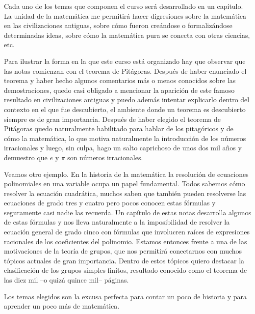 Cada uno de los temas que componen el curso será desarrollado en un capítulo. 
La unidad de la matemática me permitirá hacer digresiones
sobre la matemática en las civilizaciones antiguas, sobre cómo fueron creándose
o formalizándose determinadas ideas, sobre cómo la matemática pura se conecta
con otras ciencias, etc. 

Para ilustrar la forma en la que este curso está organizado hay que observar
que las notas comienzan con el teorema de Pitágoras. Después de haber enunciado
el teorema y haber hecho algunos comentarios más o menos conocidos sobre las
demostraciones, quedo casi obligado a mencionar la aparición de este famoso
resultado en civilizaciones antiguas y puedo además intentar explicarlo dentro
del contexto en el que fue descubierto, el ambiente donde un teorema
es descubierto siempre es de gran importancia. Después de haber elegido el
teorema de Pitágoras quedo naturalmente habilitado para hablar de los
pitagóricos y de cómo la matemática, lo que motiva
naturalmente la introducción de los números irracionales y luego, sin culpa, 
hago un salto caprichoso de unos dos mil años y demuestro que $e$ y $\pi$ son
números irracionales.

Veamos otro ejemplo. En la historia de la matemática la resolución de
ecuaciones polinomiales en una variable ocupa un papel fundamental. Todos
sabemos cómo resolver la ecuación cuadrática, muchos saben que también pueden
resolverse las ecuaciones de grado tres y cuatro pero pocos conocen estas
fórmulas y seguramente casi nadie las recuerda. Un capítulo de estas notas 
desarrolla algunos de estas fórmulas y nos
lleva naturalmente a la imposibilidad de resolver la ecuación general de grado
cinco con fórmulas que involucren raíces de expresiones racionales de los
coeficientes del polinomio. Estamos entonces frente a una de las motivaciones
de la teoría de grupos, que nos permitirá conectarnos con muchos tópicos
actuales de gran importancia. Dentro de estos tópicos quiero destacar la
clasificación de los grupos simples finitos, resultado conocido como el teorema
de las diez mil --o quizá quince mil-- páginas. 

Los temas elegidos son la excusa perfecta para contar un poco de historia y
para aprender un poco más de matemática. 

